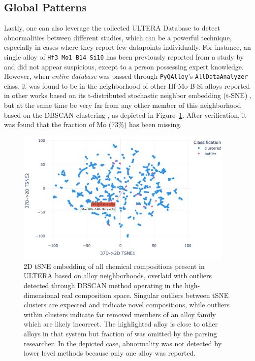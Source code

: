 \subsection{Global Patterns} \label{pyqalloy:ssec:global}

Lastly, one can also leverage the collected ULTERA Database to detect abnormalities between different studies, which can be a powerful technique, especially in cases where they report few datapoints individually. For instance, an single alloy of \texttt{Hf3 Mo1 B14 Si10} has been previously reported from a study by \citet{Yu2012TensileTemperatures} and did not appear suspicious, except to a person possessing expert knowledge. However, when \emph{entire database} was passed through \texttt{PyQAlloy}'s \texttt{AllDataAnalyzer} class, it was found to be in the neighborhood of other Hf-Mo-B-Si alloys reported in other works based on its t-distributed stochastic neighbor embedding (t-SNE) \cite{HintonStochasticEmbedding}, but at the same time be very far from any other member of this neighborhood based on the DBSCAN clustering \cite{Ester1996ANoise}, as depicted in Figure~\ref{pyqalloy:fig:patternglobal}. After verification, it was found that the fraction of Mo ($73\%$) has been missing.

\begin{figure}[H]
    \centering
    \includegraphics[width=0.95\textwidth]{pyqalloy/PyQAlloy_tSNE+DBSCAN.png}
    \caption{2D tSNE embedding of all chemical compositions present in ULTERA based on alloy neighborhoods, overlaid with outliers detected through DBSCAN method operating in the high-dimensional real composition space. Singular outliers between tSNE clusters are expected and indicate novel compositions, while outliers within clusters indicate far removed members of an alloy family which are likely incorrect. The highlighted  alloy is close to other alloys in that system but fraction of  was omitted by the parsing researcher. In the depicted case, abnormality was not detected by lower level methods because only one alloy was reported.}
    \label{pyqalloy:fig:patternglobal}
\end{figure}

